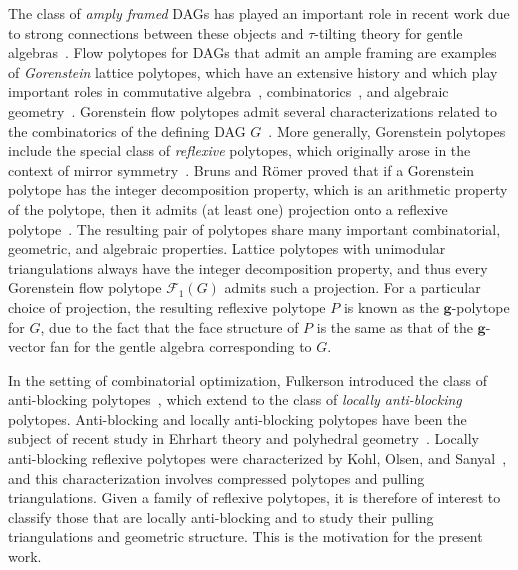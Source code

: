 \documentclass[12pt]{amsart}
\theoremstyle{definition}
\newcommand\bg{\mathbf{g}}
\newcommand\calF{\mathcal{F}}
\begin{document}
The class of \emph{amply framed} DAGs has played an important role in recent work due to strong connections between these objects and $\tau$-tilting theory for gentle algebras~\cite{gfan_uqam_arxiv,Polytopes2,Berggren,berggren2026framingtriangulationsframingposets,berggrenserhiyenko}.
Flow polytopes for DAGs that admit an ample framing are examples of \emph{Gorenstein} lattice polytopes, which have an extensive history and which play important roles in commutative algebra~\cite{hibidepthreflexive,specialsimplicestoricrings}, combinatorics~\cite{Athanasiadis,beckfreesum,braundavissolus,BrunsRomer,chapotonqgorenstein,rootsgorensteinfano,gorensteingraphicmatroids,gorensteinlecturehall,facetsvolumegorenstein,hibireflexiveposets,gorensteintrinomial,gorensteinmatroids,lorenznill,kohlolsensanyal,nillvolumereflexive,nillschepers,ohsugigorensteincut,tsuchiyagorensteinsimplices,tsuchiya2026classificationcountinggorensteinsimplices,tsuchiya2026gorensteinsimplicesbinaryselfcomplementary}, and algebraic geometry~\cite{batyrev,coxmirrorsurvey}.
Gorenstein flow polytopes admit several characterizations related to the combinatorics of the defining DAG $G$~\cite{Polytopes2,BraunCornejo}.
More generally, Gorenstein polytopes include the special class of \emph{reflexive} polytopes, which originally arose in the context of mirror symmetry~\cite{batyrev}.
Bruns and R\"omer proved that if a Gorenstein polytope has the integer decomposition property, which is an arithmetic property of the polytope, then it admits (at least one) projection onto a reflexive polytope~\cite{BrunsRomer}.
The resulting pair of polytopes share many important combinatorial, geometric, and algebraic properties.
Lattice polytopes with unimodular triangulations always have the integer decomposition property, and thus every Gorenstein flow polytope $\calF_1(G)$ admits such a projection.
For a particular choice of projection, the resulting reflexive polytope $P$ is known as the $\bg$-polytope for $G$, due to the fact that the face structure of $P$ is the same as that of the $\bg$-vector fan for the gentle algebra corresponding to $G$.

In the setting of combinatorial optimization, Fulkerson introduced the class of anti-blocking polytopes~\cite{fulkersonblockingantiblocking,fulkersonantiblocking}, which extend to the class of \emph{locally anti-blocking} polytopes.
Anti-blocking and locally anti-blocking polytopes have been the subject of recent study in Ehrhart theory and polyhedral geometry~\cite{sanyalgeometricantiblocking,kohlolsensanyal,ohsugitsuchiyalocallyantiblocking,RR}.
Locally anti-blocking reflexive polytopes were characterized by Kohl, Olsen, and Sanyal~\cite{kohlolsensanyal}, and this characterization involves compressed polytopes and pulling triangulations.
Given a family of reflexive polytopes, it is therefore of interest to classify those that are locally anti-blocking and to study their pulling triangulations and geometric structure.
This is the motivation for the present work.
\end{document}
